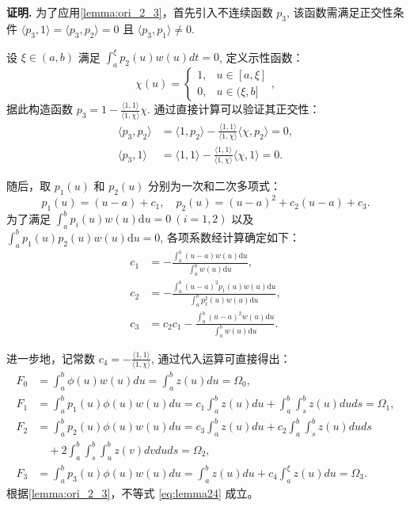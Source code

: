 \documentclass[a4paper, 12pt, oneside]{article}
\theoremstyle{cn_theorem}
\begin{document}
\textbf{\heiti 证明.} 为了应用\cref{lemma:ori_2_3}，首先引入不连续函数 $p_3$, 该函数需满足正交性条件 $\langle p_3, 1 \rangle = \langle p_3, p_2 \rangle = 0$ 且 $\langle p_3, p_1 \rangle \neq 0$.

设 $\xi \in (a,b)$ 满足 $\int_a^\xi p_2(u) w(u) dt = 0$, 定义示性函数：
\begin{equation*}
    \chi(u) = \begin{cases} 1, & u \in [a, \xi] \\ 0, & u \in (\xi, b] \end{cases},
\end{equation*}
据此构造函数 $p_3 = 1 - \frac{\langle 1, 1 \rangle}{\langle 1, \chi \rangle} \chi$. 通过直接计算可以验证其正交性：
\begin{align*}
    \langle p_3, p_2 \rangle &= \langle 1, p_2 \rangle - \frac{\langle 1, 1 \rangle}{\langle 1, \chi \rangle} \langle \chi, p_2 \rangle = 0, \\
    \langle p_3, 1 \rangle &= \langle 1, 1 \rangle - \frac{\langle 1, 1 \rangle}{\langle 1, \chi \rangle} \langle \chi, 1 \rangle = 0.
\end{align*}

随后，取 $p_1(u)$ 和 $p_2(u)$ 分别为一次和二次多项式：
\begin{equation*}
    p_1(u) = (u-a) + c_1, \quad p_2(u) = (u-a)^2 + c_2(u-a) + c_3.
\end{equation*}
为了满足 $\int_a^b p_i(u) w(u) \mathrm{d}u = 0 \ (i=1,2)$ 以及 $\int_a^b p_1(u) p_2(u) w(u) \mathrm{d}u = 0$, 各项系数经计算确定如下：
\begin{align*}
    c_1 &= -\frac{\int_a^b (u-a) w(u) \mathrm{d}u}{\int_a^b w(u) \mathrm{d}u}, \\
    c_2 &= -\frac{\int_a^b (u-a)^2 p_1(u) w(u) \mathrm{d}u}{\int_a^b p_1^2(u) w(u) \mathrm{d}u}, \\
    c_3 &= c_2 c_1 - \frac{\int_a^b (u-a)^2 w(u) \mathrm{d}u}{\int_a^b w(u) \mathrm{d}u}.
\end{align*}

进一步地，记常数 $c_4 = -\frac{\langle 1, 1 \rangle}{\langle 1, \chi \rangle}$, 通过代入运算可直接得出：
\begin{align*}
    F_0 &= \int_a^b \phi(u) w(u) du = \int_a^b z(u) du = \Omega_0, \\
    F_1 &= \int_a^b p_1(u) \phi(u) w(u) du = c_1 \int_a^b z(u) du + \int_a^b \int_s^b z(u) du ds = \Omega_1, \\
    F_2 &= \int_a^b p_2(u) \phi(u) w(u) du = c_3 \int_a^b z(u) du + c_2 \int_a^b \int_s^b z(u) du ds \nonumber \\
        & \quad + 2 \int_a^b \int_s^b \int_u^b z(v) dv du ds = \Omega_2,\\
    F_3 &= \int_a^b p_3(u) \phi(u) w(u) du = \int_a^b z(u) du + c_4 \int_a^\xi z(u) du = \Omega_3.
\end{align*}
根据\cref{lemma:ori_2_3}，不等式 \eqref{eq:lemma24} 成立。
\end{document}
